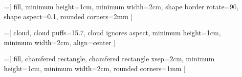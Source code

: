 

\def \mheight {1cm}
\def \mwidth {2cm}

=[
  fill, 
  minimum height=\mheight, 
  minimum width=\mwidth, 
  shape border rotate=90, 
  shape aspect=0.1,
  rounded corners=2mm
]

=[
  cloud, 
  cloud puffs=15.7, 
  cloud ignores aspect, 
  minimum height=\mheight,
  minimum width=\mwidth, 
  align=center
]

=[
  fill,
  chamfered rectangle,
  chamfered rectangle xsep=2cm,
  minimum height=\mheight, 
  minimum width=\mwidth,
  rounded corners=1mm
]


